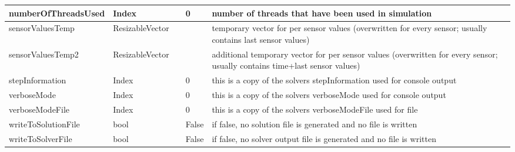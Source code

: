 \begin{center}
\begin{longtable}{| p{4.2cm} | p{2.5cm} | p{0.3cm} | p{3.0cm} | p{6cm} |}
    numberOfThreadsUsed &     Index &      &     0 &     number of threads that have been used in simulation\\ \hline
    sensorValuesTemp &     ResizableVector &      &      &     temporary vector for per sensor values (overwritten for every sensor; usually contains last sensor values)\\ \hline
    sensorValuesTemp2 &     ResizableVector &      &      &     additional temporary vector for per sensor values (overwritten for every sensor; usually contains time+last sensor values)\\ \hline
    stepInformation &     Index &      &     0 &     this is a copy of the solvers stepInformation used for console output\\ \hline
    verboseMode &     Index &      &     0 &     this is a copy of the solvers verboseMode used for console output\\ \hline
    verboseModeFile &     Index &      &     0 &     this is a copy of the solvers verboseModeFile used for file\\ \hline
    writeToSolutionFile &     bool &      &     False &     if false, no solution file is generated and no file is written\\ \hline
    writeToSolverFile &     bool &      &     False &     if false, no solver output file is generated and no file is written\\ \hline
	  \end{longtable}
	\end{center}

